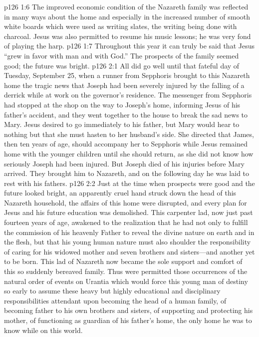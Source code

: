 \vs p126 1:6 The improved economic condition of the Nazareth family was reflected in many ways about the home and especially in the increased number of smooth white boards which were used as writing slates, the writing being done with charcoal. Jesus was also permitted to resume his music lessons; he was very fond of playing the harp.
\pc \vs p126 1:7 Throughout this year it can truly be said that Jesus “grew in favor with man and with God.” The prospects of the family seemed good; the future was bright.
\vs p126 2:1 All did go well until that fateful day of Tuesday, September 25, when a runner from Sepphoris brought to this Nazareth home the tragic news that Joseph had been severely injured by the falling of a derrick while at work on the governor’s residence. The messenger from Sepphoris had stopped at the shop on the way to Joseph’s home, informing Jesus of his father’s accident, and they went together to the house to break the sad news to Mary. Jesus desired to go immediately to his father, but Mary would hear to nothing but that she must hasten to her husband’s side. She directed that James, then ten years of age, should accompany her to Sepphoris while Jesus remained home with the younger children until she should return, as she did not know how seriously Joseph had been injured. But Joseph died of his injuries before Mary arrived. They brought him to Nazareth, and on the following day he was laid to rest with his fathers.
\pc \vs p126 2:2 Just at the time when prospects were good and the future looked bright, an apparently cruel hand struck down the head of this Nazareth household, the affairs of this home were disrupted, and every plan for Jesus and his future education was demolished. This carpenter lad, now just past fourteen years of age, awakened to the realization that he had not only to fulfill the commission of his heavenly Father to reveal the divine nature on earth and in the flesh, but that his young human nature must also shoulder the responsibility of caring for his widowed mother and seven brothers and sisters---and another yet to be born. This lad of Nazareth now became the sole support and comfort of this so suddenly bereaved family. Thus were permitted those occurrences of the natural order of events on Urantia which would force this young man of destiny so early to assume these heavy but highly educational and disciplinary responsibilities attendant upon becoming the head of a human family, of becoming father to his own brothers and sisters, of supporting and protecting his mother, of functioning as guardian of his father’s home, the only home he was to know while on this world.
